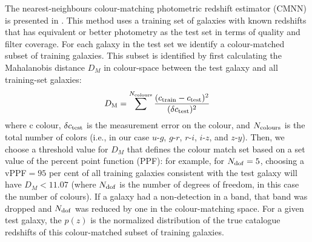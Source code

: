 The nearest-neighbours colour-matching photometric redshift estimator (\textsc{CMNN}) is presented in \citet[][hereafter G18]{Graham:17}. This method uses a training set of galaxies with known redshifts that has equivalent or better photometry as the test set in terms of quality and filter coverage. For each galaxy in the test set we identify a colour-matched subset of training galaxies.  This subset is identified by first calculating the Mahalanobis distance $D_M$ in colour-space between the test galaxy and all training-set galaxies:
\begin{equation} 
D_{\rm M} = \sum^{N_{\rm colours}}\frac{(c_{\rm train}-c_{\rm test})^2}{(\delta c_{\rm test})^2}
\end{equation}
where c colour, $\delta c_{\rm test}$ is the measurement error on the colour, and $N_{\rm colours}$ is the total number of colors (i.e., in our case $u$-$g$, $g$-$r$, $r$-$i$, $i$-$z$, and $z$-$y$). Then, we choose a threshold value for $D_M$ that defines the colour match set based on a set value of the percent point function (PPF): for example, for $N_{\rm dof}=5$, choosing a vPPF$=95$ per cent of all training galaxies consistent with the test galaxy will have $D_M < 11.07$ (where $N_{\rm dof}$ is the number of degrees of freedom, in this case the number of colours). If a galaxy had a non-detection in a band, that band was dropped and $N_{\rm dof}$ was reduced by one in the colour-matching space.  For a given test galaxy, the $p(z)$ is the normalized distribution of the true catalogue redshifts of this colour-matched subset of training galaxies.

